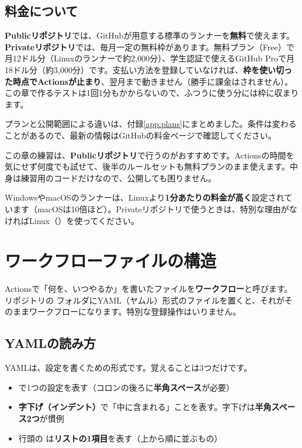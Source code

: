 \subsection{料金について}

\textbf{Publicリポジトリ}では、GitHubが用意する標準のランナーを\textbf{無料}で使えます。\textbf{Privateリポジトリ}では、毎月一定の無料枠があります。無料プラン（Free）で月12ドル分（Linuxのランナーで約2,000分）、学生認証で使えるGitHub Proで月18ドル分（約3,000分）です。支払い方法を登録していなければ、\textbf{枠を使い切った時点でActionsが止まり}、翌月まで動きません（勝手に課金はされません）。この章で作るテストは1回1分もかからないので、ふつうに使う分には枠に収まります。

プランと公開範囲による違いは、付録\ref{app:plans}にまとめました。条件は変わることがあるので、最新の情報はGitHubの料金ページで確認してください。

\begin{hintbox}
この章の練習は、\textbf{Publicリポジトリ}で行うのがおすすめです。Actionsの時間を気にせず何度でも試せて、後半のルールセットも無料プランのまま使えます。中身は練習用のコードだけなので、公開しても困りません。
\end{hintbox}

\begin{warnbox}
WindowsやmacOSのランナーは、Linuxより\textbf{1分あたりの料金が高く}設定されています（macOSは10倍ほど）。Privateリポジトリで使うときは、特別な理由がなければLinux（）を使ってください。
\end{warnbox}

\section{ワークフローファイルの構造}

Actionsで「何を、いつやるか」を書いたファイルを\textbf{ワークフロー}と呼びます。リポジトリの  フォルダにYAML（ヤムル）形式のファイルを置くと、それがそのままワークフローになります。特別な登録操作はいりません。

\subsection{YAMLの読み方}

YAMLは、設定を書くための形式です。覚えることは3つだけです。

\begin{itemize}[leftmargin=1.4em]
  \item {} で1つの設定を表す（コロンの後ろに\textbf{半角スペース}が必要）
  \item \textbf{字下げ（インデント）}で「中に含まれる」ことを表す。字下げは\textbf{半角スペース2つ}が慣例
  \item 行頭の \cmd{- } は\textbf{リストの1項目}を表す（上から順に並ぶもの）
\end{itemize}

